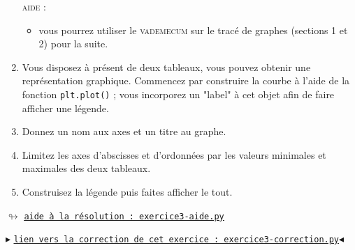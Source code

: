 \documentclass[11pt]{article}
\begin{document}
\begin{enumerate}
 
 
 \medskip
 
\smallskip
\textsc{aide : }
\begin{itemize}
 \item vous pourrez utiliser le \textsc{vademecum} sur le tracé de graphes (sections 1 et 2) pour la suite.
 \end{itemize}
 
 \smallskip
 
 
 \item Vous disposez à présent de deux tableaux, vous pouvez obtenir une représentation graphique. Commencez par construire la courbe à l'aide de la fonction \texttt{plt.plot()} ; vous incorporez un "label" à cet objet afin de faire afficher une légende.
 
 
 \medskip
 
 \item Donnez un nom aux axes et un titre au graphe.
 
 \medskip
 
 \item Limitez les axes d'abscisses et d'ordonnées par les valeurs minimales et maximales des deux tableaux.
 
 \medskip
 \item Construisez la légende puis faites afficher le tout.
 

\end{enumerate}




\begin{center}
 $\looparrowright$ \href{https://github.com/formationPythonPC-Juin/aides-formation/blob/master/exercice3-aide.py}{\underline{\texttt{aide à la résolution : exercice3-aide.py}}}
\end{center}



\begin{center}
$\blacktriangleright$ \href{https://github.com/formationPythonPC-Juin/corrections-formation/blob/master/exercice3-correction.py}{\underline{\texttt{lien vers la correction de cet exercice : exercice3-correction.py}}}$\blacktriangleleft$                                                                                                                                                                    \end{center}
\end{document}
